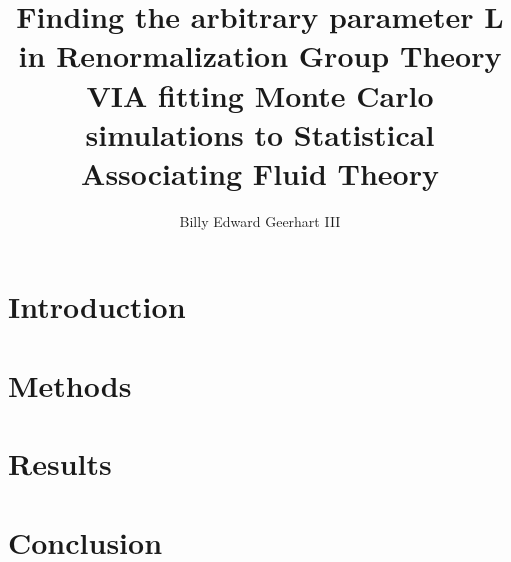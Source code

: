 \documentclass[12pt,twoside]{report}
\title{Finding the arbitrary parameter L in Renormalization Group Theory VIA fitting Monte Carlo simulations to Statistical Associating Fluid Theory}
\author{Billy Edward Geerhart III}
\begin{document}






\tableofcontents

\listoffigures

\chapter{Introduction}


\chapter{Methods}


\chapter{Results}


%

\chapter{Conclusion}



\end{document}
